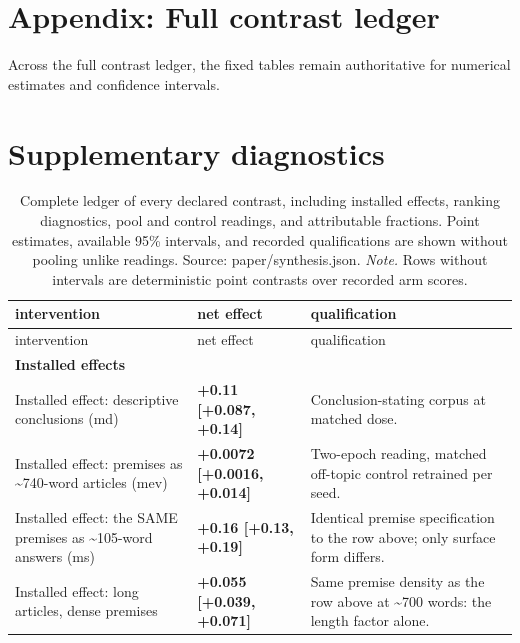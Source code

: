 \documentclass[10pt]{article}
\begin{document}
\section{ Appendix: Full contrast ledger }
\label{sec:appendix}

Across the full contrast ledger, the fixed tables remain authoritative for numerical estimates and confidence intervals.






\appendix
\section{Supplementary diagnostics}




{\footnotesize
\begin{longtable}{ p{4.08cm}lp{7.60cm} }

\caption{ Complete ledger of every declared contrast, including installed effects, ranking diagnostics, pool and control readings, and attributable fractions. Point estimates, available 95\% intervals, and recorded qualifications are shown without pooling unlike readings. Source: paper/synthesis.json. \emph{Note.} Rows without intervals are deterministic point contrasts over recorded arm scores. }
\label{tab:contribution_ladder}\\
\toprule
intervention & net effect & qualification \\
\midrule
\endfirsthead
\toprule
intervention & net effect & qualification \\
\midrule
\endhead
\bottomrule
\endfoot
\bottomrule
\endlastfoot

\textbf{ Installed effects } &  &  \\

Installed effect: descriptive conclusions (md) & \textbf{ +0.11 [+0.087, +0.14] } & Conclusion-stating corpus at matched dose. \\

Installed effect: premises as \textasciitilde{}740-word articles (mev) & \textbf{ +0.0072 [+0.0016, +0.014] } & Two-epoch reading, matched off-topic control retrained per seed. \\

Installed effect: the SAME premises as \textasciitilde{}105-word answers (ms) & \textbf{ +0.16 [+0.13, +0.19] } & Identical premise specification to the row above; only surface form differs. \\

Installed effect: long articles, dense premises & \textbf{ +0.055 [+0.039, +0.071] } & Same premise density as the row above at \textasciitilde{}700 words: the length factor alone. \\


\end{longtable}}
\end{document}
